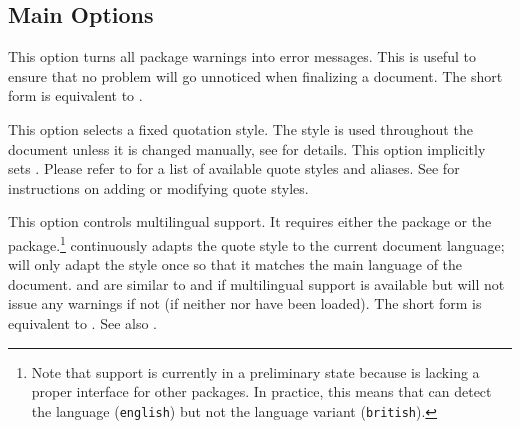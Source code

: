 \documentclass{ltxdockit}[2010/09/26]
\begin{document}
\subsection{Main Options}
\label{opt:opt}

\begin{optionlist}


This option turns all package warnings into error messages. This is useful to ensure that no problem will go unnoticed when finalizing a document. The short form  is equivalent to .


This option selects a fixed quotation style. The style is used throughout the document unless it is changed manually, see  for details. This option implicitly sets . Please refer to  for a list of available quote styles and aliases. See  for instructions on adding or modifying quote styles.


This option controls multilingual support. It requires either the  package or the  package.\footnote{Note that  support is currently in a preliminary state because  is lacking a proper interface for other packages. In practice, this means that  can detect the language (\eg \texttt{english}) but not the language variant (\eg \texttt{british}).}  continuously adapts the quote style to the current document language;  will only adapt the style once so that it matches the main language of the document.  and  are similar to  and  if multilingual support is available but will not issue any warnings if not (\ie if neither  nor  have been loaded). The short form  is equivalent to . See also .


\end{optionlist}
\end{document}
